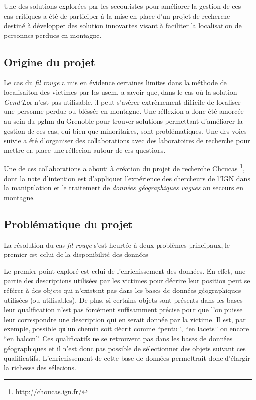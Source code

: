 Une des solutions explorées par les secouristes pour améliorer la
gestion de ces cas critiques a été de participer à la mise en place
d'un projet de recherche destiné à développer des solution innovantes
visant à faciliter la localisation de personnes perdues en montagne.


\subsection{Origine du projet}
\label{subsec:1-2-1}

Le cas du \emph{fil rouge} a mis en évidence certaines limites dans la
méthode de localisaiton des victimes par les \ac{usem}, a savoir que,
dans le cas où la solution \emph{Gend'Loc} n'est pas utilisable, il
peut s'avérer extrèmement difficile de localiser une personne perdue
ou bléssée en montagne. Une réflexion a donc été amorcée au sein du
\ac{pghm} du Grenoble pour trouver solutions permettant d'améliorer la
gestion de ces cas, qui bien que minoritaires, sont
problématiques. Une des voies suivie a été d'organiser des
collaborations avec des laboratoires de recherche pour mettre en place
une réflecion autour de ces questions.

Une de ces collaborations a abouti à création du projet de recherche
Choucas \footnote{\url{http://choucas.ign.fr/}}, dont la note
d'intention est d'appliquer l'expérience des chercheurs de l'IGN dans
la manipulation et le traitement de \emph{données géographiques
  vagues} au secours en montagne. 


\subsection{Problématique du projet}
\label{subsec:1-2-2}

La résolution du cas \emph{fil rouge} s'est heurtée à deux problèmes
principaux, le premier est celui de la disponibilité des données

Le premier point exploré est celui de l'enrichissement des données. En
effet, une partie des descriptions utilisées par les victimes pour
décrire leur position peut se référer à des objets qui n'existent pas
dans les bases de données géographiques utilisées (ou utilisables). De
plus, si certains objets sont présents dans les bases leur
qualification n'est pas forcément suffisamment précise pour que l'on
puisse leur correspondre une description qui en serait donnée par la
victime. Il est, par exemple, possible qu'un chemin soit décrit comme
\enquote{pentu}, \enquote{en lacets} ou encore \enquote{en
  balcon}. Ces qualificatifs ne se retrouvent pas dans les bases de
données géographiques et il n'est donc pas possible de sélectionner
des objets suivant ces qualificatifs. L'enrichissement de cette base
de données permettrait donc d'élargir la richesse des sélecions.

